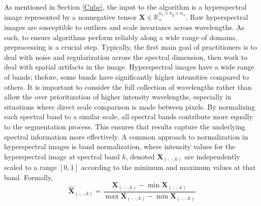 As mentioned in Section \ref{Cube}, the input to the algorithm is a hyperspectral image represented by a nonnegative tensor $\mathbf{X} \in \mathbb{R}_+^{n_x \times n_y \times n_\lambda}$. Raw hyperspectral images are susceptible to outliers and scale invariance across wavelengths. As such, to ensure algorithms perform reliably along a wide range of domains, preprocessing is a crucial step. Typically, the first main goal of practitioners is to deal with noise and regularization across the spectral dimension, then work to deal with spatial artifacts in the image. 
Hyperspectral images have a wide range of bands; thefore, some bands have significantly higher intensities compared to others. It is important to consider the full collection of wavelengths rather than allow the over prioritization of higher intensity wavelengths, especially in situations where direct scale comparison is made between pixels. By normalizing each spectral band to a similar scale, all spectral bands contribute more equally to the segmentation process. This ensures that results capture the underlying spectral information more effectively. A common approach to normalization in hyperspectral images is band normalization, where intensity values for the hyperspectral image at spectral band $k$, denoted $\mathbf{X}_{(\cdot, \cdot, k)}$ are independently scaled to a range $[0,1]$ according to the minimum and maximum values at that band. Formally,
\begin{equation}
    \label{alg:normalization}
    \hat{\mathbf{X}}_{(\cdot, \cdot, k)} =  \frac{\mathbf{X}_{(\cdot, \cdot, k)} - \min\mathbf{X}_{(\cdot, \cdot, k)}}{\max\mathbf{X}_{(\cdot, \cdot, k)} - \min\mathbf{X}_{(\cdot, \cdot, k)}}
\end{equation}


